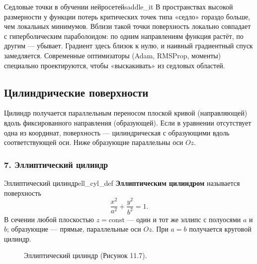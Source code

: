 \documentclass[12pt,a4paper]{article}
\begin{document}
\begin{remarkIT}{Седловые точки в обучении нейросетей}{saddle_it}
  В пространствах высокой размерности у функции потерь критических
  точек типа «седло» гораздо больше, чем локальных минимумов. Вблизи
  такой точки поверхность локально совпадает с гиперболическим
  параболоидом: по одним направлениям функция растёт, по другим —
  убывает. Градиент здесь близок к нулю, и наивный градиентный спуск
  замедляется. Современные оптимизаторы (Adam, RMSProp, моменты)
  специально проектируются, чтобы «выскакивать» из седловых областей.
\end{remarkIT}

\subsection*{Цилиндрические поверхности}

Цилиндр получается параллельным переносом плоской кривой
(направляющей) вдоль фиксированного направления (образующей). Если
в уравнении отсутствует одна из координат, поверхность —
цилиндрическая с образующими вдоль соответствующей оси. Ниже
образующие параллельны оси $Oz$.

\subsubsection*{7. Эллиптический цилиндр}

\begin{definition}{Эллиптический цилиндр}{ell_cyl_def}
  \textbf{Эллиптическим цилиндром} называется поверхность
  \begin{equation}
    \frac{x^2}{a^2} + \frac{y^2}{b^2} = 1. \tag{11.10}
  \end{equation}
  В сечении любой плоскостью $z = \text{const}$ — один и тот же эллипс
  с полуосями $a$ и $b$; образующие — прямые, параллельные оси $Oz$.
  При $a = b$ получается круговой цилиндр.
\end{definition}

\begin{figure}[h!]
  \centering
  \caption{Эллиптический цилиндр (Рисунок 11.7).}
  \label{fig:ell_cyl}
\end{figure}
\end{document}
